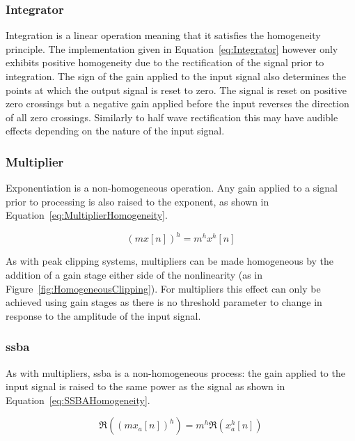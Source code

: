 		\subsubsection*{Integrator}
			Integration is a linear operation meaning that it satisfies the homogeneity principle. The
			implementation given in Equation~\ref{eq:Integrator} however only exhibits positive homogeneity due
			to the rectification of the signal prior to integration. The sign of the gain applied to the input
			signal also determines the points at which the output signal is reset to zero. The signal is reset
			on positive zero crossings but a negative gain applied before the input reverses the direction of
			all zero crossings. Similarly to half wave rectification this may have audible effects depending on
			the nature of the input signal.

		\subsubsection*{Multiplier}
			Exponentiation is a non-homogeneous operation. Any gain applied to a signal prior to processing is
			also raised to the exponent, as shown in Equation~\ref{eq:MultiplierHomogeneity}.

			\begin{equation}
				(mx[n])^{h} = m^{h}x^{h}[n]
				\label{eq:MultiplierHomogeneity}
			\end{equation}

			As with peak clipping systems, multipliers can be made homogeneous by the addition of a gain stage
			either side of the nonlinearity (as in Figure~\ref{fig:HomogeneousClipping}). For multipliers this
			effect can only be achieved using gain stages as there is no threshold parameter to change in
			response to the amplitude of the input signal.

		\subsubsection*{\acrshort{ssba}}
			As with multipliers, \acrshort{ssba} is a non-homogeneous process: the gain applied to the input
			signal is raised to the same power as the signal as shown in Equation~\ref{eq:SSBAHomogeneity}.

			\begin{equation}
				\Re \left( (mx_{a}[n])^{h} \right) = m^{h} \Re \left( x_{a}^{h}[n] \right)
				\label{eq:SSBAHomogeneity}
			\end{equation}
			

